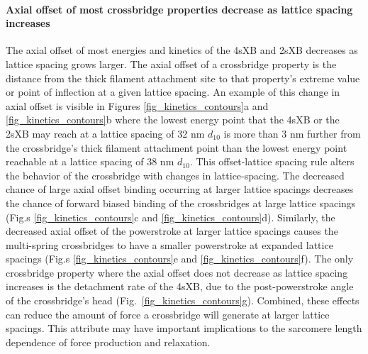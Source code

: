 \documentclass[]{article}
\begin{document}
\paragraph{Axial offset of most crossbridge properties decrease as lattice spacing increases} %
The axial offset of most energies and kinetics of the 4sXB and 2sXB decreases as lattice spacing grows larger.
The axial offset of a crossbridge property is the distance from the thick filament attachment site to that property's extreme value or point of inflection at a given lattice spacing. 
An example of this change in axial offset is visible in Figures \ref{fig_kinetics_contours}a and \ref{fig_kinetics_contours}b where the lowest energy point that the 4sXB or the 2sXB may reach at a lattice spacing of 32 nm $d_{10}$ is more than 3 nm further from the crossbridge's thick filament attachment point than the lowest energy point reachable at a lattice spacing of 38 nm $d_{10}$.
This offset-lattice spacing rule alters the behavior of the crossbridge with changes in lattice-spacing.
The decreased chance of large axial offset binding occurring at larger lattice spacings decreases the chance of forward biased binding of the crossbridges at large lattice spacings (Fig.s \ref{fig_kinetics_contours}c and \ref{fig_kinetics_contours}d).
Similarly, the decreased axial offset of the powerstroke at larger lattice spacings causes the multi-spring crossbridges to have a smaller powerstroke at expanded lattice spacings (Fig.s \ref{fig_kinetics_contours}e and \ref{fig_kinetics_contours}f).
The only crossbridge property where the axial offset does not decrease as lattice spacing increases is the detachment rate of the 4sXB, due to the post-powerstroke angle of the crossbridge's head (Fig.\ \ref{fig_kinetics_contours}g).
Combined, these effects can reduce the amount of force a crossbridge will generate at larger lattice spacings. 
This attribute may have important implications to the sarcomere length dependence of force production and relaxation.
\end{document}
